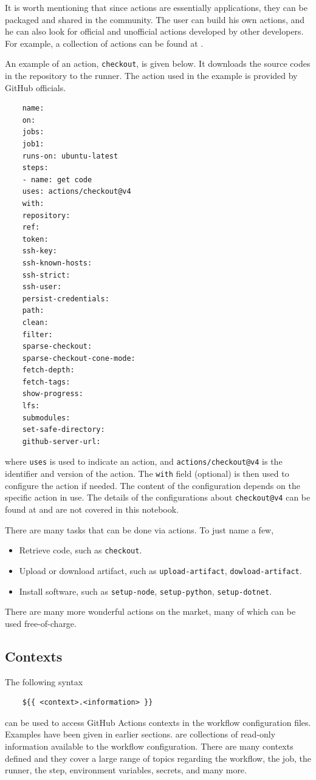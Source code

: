 It is worth mentioning that since actions are essentially applications, they can be packaged and shared in the community. The user can build his own actions, and he can also look for official and unofficial actions developed by other developers. For example, a collection of actions can be found at \cite{git2025actions}.

An example of an action, \verb|checkout|, is given below. It downloads the source codes in the repository to the runner. The action used in the example is provided by GitHub officials.
\begin{lstlisting}
	name:
	on:
	jobs:
	job1:
	runs-on: ubuntu-latest
	steps:
	- name: get code
	uses: actions/checkout@v4
	with:
	repository:
	ref:
	token:
	ssh-key:
	ssh-known-hosts:
	ssh-strict:
	ssh-user:
	persist-credentials:
	path:
	clean:
	filter:
	sparse-checkout:
	sparse-checkout-cone-mode:
	fetch-depth:
	fetch-tags:
	show-progress:
	lfs:
	submodules:
	set-safe-directory:
	github-server-url:
\end{lstlisting}
where \verb|uses| is used to indicate an action, and \verb|actions/checkout@v4| is the identifier and version of the action. The \verb|with| field (optional) is then used to configure the action if needed. The content of the configuration depends on the specific action in use. The details of the configurations about \verb|checkout@v4| can be found at \cite{git2025actions} and are not covered in this notebook. 

There are many tasks that can be done via actions. To just name a few,
\begin{itemize}
	\item Retrieve code, such as \verb|checkout|.
	\item Upload or download artifact, such as \verb|upload-artifact|, \verb|dowload-artifact|.
	\item Install software, such as \verb|setup-node|, \verb|setup-python|, \verb|setup-dotnet|.
\end{itemize}
There are many more wonderful actions on the market, many of which can be used free-of-charge.

\subsection{Contexts}

The following syntax 
\begin{lstlisting}
	${{ <context>.<information> }}
\end{lstlisting}
can be used to access GitHub Actions contexts in the workflow configuration files. Examples have been given in earlier sections.  are collections of read-only information available to the workflow configuration. There are many contexts defined and they cover a large range of topics regarding the workflow, the job, the runner, the step, environment variables, secrets, and many more.


